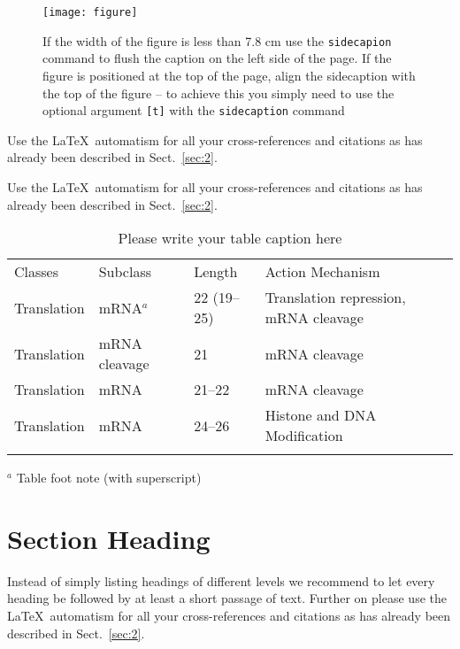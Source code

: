 \documentclass[graybox]{svmult}
\begin{document}
\begin{figure}[t]
\sidecaption[t]
\texttt{[image: figure]}
%
%
\caption{If the width of the figure is less than 7.8 cm use the \texttt{sidecapion} command to flush the caption on the left side of the page. If the figure is positioned at the top of the page, align the sidecaption with the top of the figure -- to achieve this you simply need to use the optional argument \texttt{[t]} with the \texttt{sidecaption} command}
\label{fig:2}       %
\end{figure}

 Use the \LaTeX\ automatism for all your cross-references and citations as has already been described in Sect.~\ref{sec:2}.

 Use the \LaTeX\ automatism for all your cross-refer\-ences and citations as has already been described in Sect.~\ref{sec:2}.
%
%
\begin{table}
\caption{Please write your table caption here}
\label{tab:1}       %
%
%
\begin{tabular}{p{2cm}p{2.4cm}p{2cm}p{4.9cm}}
\hline\noalign{\smallskip}
Classes & Subclass & Length & Action Mechanism  \\
\noalign{\smallskip}\svhline\noalign{\smallskip}
Translation & mRNA$^a$  & 22 (19--25) & Translation repression, mRNA cleavage\\
Translation & mRNA cleavage & 21 & mRNA cleavage\\
Translation & mRNA  & 21--22 & mRNA cleavage\\
Translation & mRNA  & 24--26 & Histone and DNA Modification\\
\noalign{\smallskip}\hline\noalign{\smallskip}
\end{tabular}
$^a$ Table foot note (with superscript)
\end{table}
%
\section{Section Heading}
\label{sec:3}
Instead of simply listing headings of different levels we recommend to
let every heading be followed by at least a short passage of text.
Further on please use the \LaTeX\ automatism for all your
cross-references and citations as has already been described in
Sect.~\ref{sec:2}.
\end{document}

